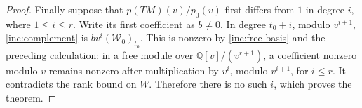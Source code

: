 \begin{proof}
Finally suppose that $p(TM)(v)/p_0(v)$ first differs from $1$
in degree $i$, where $1\le i\le r$. Write its first coefficient
as $b\ne0$. In degree $t_0+i$, modulo $v^{i+1}$,
\eqref{inc:complement} is $b v^i(\mathcal W_0)_{t_0}$.
This is nonzero by \eqref{inc:free-basis} and the preceding
calculation: in a free module over $\mathbb Q[v]/(v^{r+1})$,
a coefficient nonzero modulo $v$ remains nonzero after
multiplication by $v^i$, modulo $v^{i+1}$, for $i\le r$.
It contradicts the rank bound on $W$.
Therefore there is no such $i$, which proves the theorem.
\end{proof}
